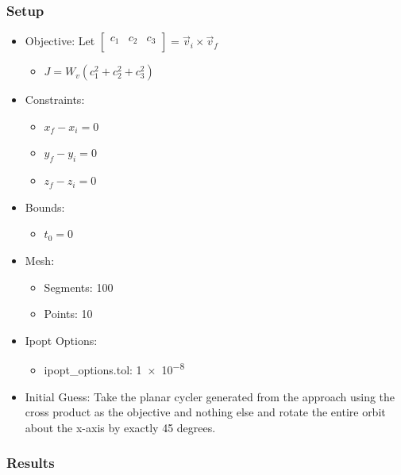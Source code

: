 \documentclass{article}
\begin{document}
\subsubsection{Setup}

\begin{itemize}
    \item Objective: Let $\left[\begin{matrix}c_1&c_2&c_3\\\end{matrix}\right] = \vec{v}_i\times\vec{v}_f$
    \begin{itemize}
        \item $J = W_v\left(c_1^2 + c_2^2 + c_3^2\right)$
    \end{itemize}
    \item Constraints: 
    \begin{itemize}
        \item $x_f - x_i = 0$
        \item $y_f - y_i = 0$
        \item $z_f - z_i = 0$
    \end{itemize}
    \item Bounds:
    \begin{itemize}
        \item $t_0 = 0$
    \end{itemize}
    \item Mesh:
    \begin{itemize}
        \item Segments: 100
        \item Points: 10
    \end{itemize}
    \item Ipopt Options:
    \begin{itemize}
        \item ipopt\_options.tol: \num{1e-8}
    \end{itemize}
    \item Initial Guess: Take the planar cycler generated from the approach using the cross product as the objective and nothing else and rotate the entire orbit about the x-axis by exactly 45 degrees.
\end{itemize}

\subsubsection{Results}
\end{document}
